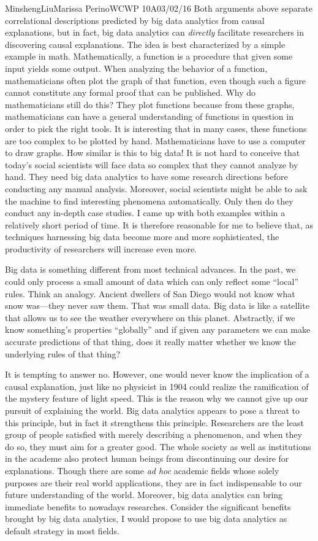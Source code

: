 \documentclass[12pt,letterpaper]{article}
\begin{document}
\begin{mla}{Minsheng}{Liu}{Marissa Perino}{WCWP 10A}{03/02/16}
Both arguments above separate correlational descriptions predicted by
big data analytics from causal explanations, but in fact, big data
analytics can \emph{directly} facilitate researchers in discovering
causal explanations. The idea is best characterized by a simple example
in math. Mathematically, a function is a procedure that given some input
yields some output. When analyzing the behavior of a function,
mathematicians often plot the graph of that function, even though such a
figure cannot constitute any formal proof that can be published. Why do
mathematicians still do this? They plot functions because from these
graphs, mathematicians can have a general understanding of functions in
question in order to pick the right tools. It is interesting that in
many cases, these functions are too complex to be plotted by hand.
Mathematicians have to use a computer to draw graphs. How similar is
this to big data! It is not hard to conceive that today's social
scientists will face data so complex that they cannot analyze by hand.
They need big data analytics to have some research directions before
conducting any manual analysis. Moreover, social scientists might be
able to ask the machine to find interesting phenomena automatically.
Only then do they conduct any in-depth case studies. I came up with both
examples within a relatively short period of time. It is therefore
reasonable for me to believe that, as techniques harnessing big data
become more and more sophisticated, the productivity of researchers will
increase even more.

Big data is something different from most technical advances. In the
past, we could only process a small amount of data which can only
reflect some ``local'' rules. Think an analogy. Ancient dwellers of San
Diego would not know what snow was---they never saw them. That was small
data. Big data is like a satellite that allows us to see the weather
everywhere on this planet. Abstractly, if we know something's properties
``globally'' and if given any parameters we can make accurate
predictions of that thing, does it really matter whether we know the
underlying rules of that thing?

It is tempting to answer no. However, one would never know the
implication of a causal explanation, just like no physicist in 1904
could realize the ramification of the mystery feature of light speed.
This is the reason why we cannot give up our pursuit of explaining the
world. Big data analytics appears to pose a threat to this principle,
but in fact it strengthens this principle. Researchers are the least
group of people satisfied with merely describing a phenomenon, and when
they do so, they must aim for a greater good. The whole society as well
as institutions in the academe also protect human beings from
discontinuing our desire for explanations. Though there are some
\emph{ad hoc} academic fields whose solely purposes are their real world
applications, they are in fact indispensable to our future understanding
of the world. Moreover, big data analytics can bring immediate benefits
to nowadays researches. Consider the significant benefits brought by big
data analytics, I would propose to use big data analytics as default
strategy in most fields.


\end{mla}
\end{document}
